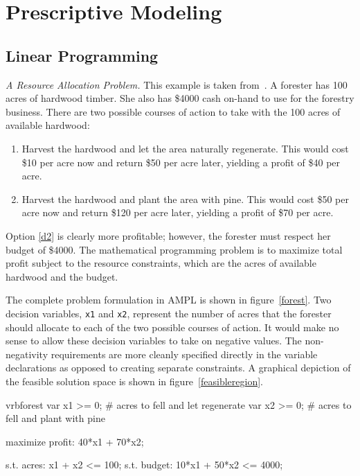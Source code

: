\chapter{Prescriptive Modeling}
\section{Linear Programming}

\emph{A Resource Allocation Problem.} This example is taken 
from~\cite{chvatal:1983}.  A forester has 100
acres of hardwood timber. She also has \$4000 cash on-hand to use for
the forestry business. There are two possible courses of action to
take with the 100 acres of available hardwood:
\begin{enumerate}
\item Harvest the hardwood and let the area naturally regenerate. This
  would cost \$10 per acre now and return \$50 per acre later,
  yielding a profit of \$40 per acre.
\item Harvest the hardwood and plant the area with pine. This would
  cost \$50 per acre now and return \$120 per acre later, yielding a
  profit of \$70 per acre. \label{d2}
\end{enumerate}
Option \ref{d2} is clearly more profitable; however, the forester must
respect her budget of \$4000. The mathematical programming problem is
to maximize total profit subject to the resource constraints, which
are the acres of available hardwood and the budget.

The complete problem formulation in AMPL is shown in
figure~\ref{forest}.  Two decision variables, \texttt{x1} and
\texttt{x2}, represent the number of acres that the forester should
allocate to each of the two possible courses of action.  It would make
no sense to allow these decision variables to take on negative
values. The non-negativity requirements are more cleanly specified
directly in the variable declarations as opposed to creating separate
constraints. A graphical depiction of the feasible solution space is
shown in figure~\ref{feasibleregion}.

\begin{SaveVerbatim}{vrbforest}
var x1 >= 0;  # acres to fell and let regenerate
var x2 >= 0;  # acres to fell and plant with pine

maximize profit: 40*x1 + 70*x2;

s.t. acres: x1 + x2 <= 100;
s.t. budget: 10*x1 + 50*x2 <= 4000;
\end{SaveVerbatim}


